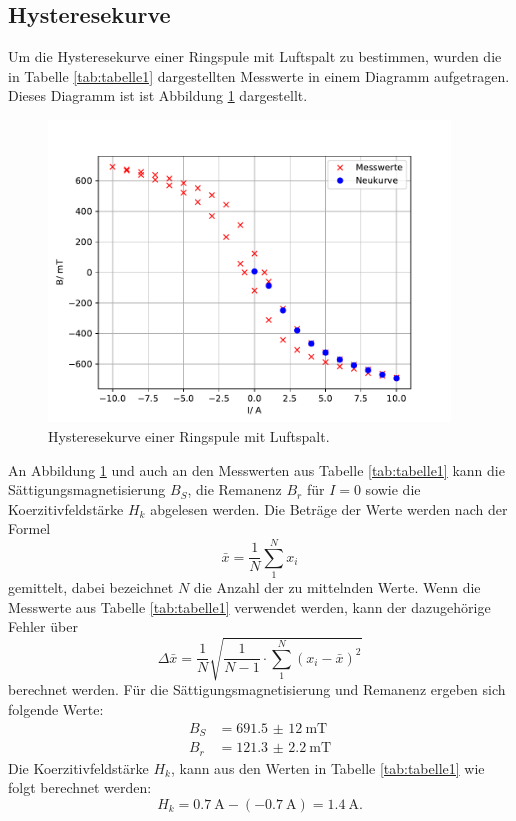 \subsection{Hysteresekurve}
\noindent Um die Hysteresekurve einer Ringspule mit
Luftspalt zu bestimmen, wurden die in Tabelle
\ref{tab:tabelle1} dargestellten Messwerte in einem
Diagramm aufgetragen. Dieses Diagramm ist ist Abbildung
\ref{fig:plothys} dargestellt.

\begin{figure}[H]
  \centering
  \includegraphics[height=8cm]{plothys.pdf}
  \caption{Hysteresekurve einer Ringspule mit Luftspalt.}
  \label{fig:plothys}
\end{figure}
\noindent An Abbildung \ref{fig:plothys} und auch an den
Messwerten
aus Tabelle \ref{tab:tabelle1} kann die
Sättigungsmagnetisierung $B_{S}$, die Remanenz
$B_{r}$ für $I=0$ sowie die Koerzitivfeldstärke
$H_{k}$ abgelesen werden.
Die Beträge der Werte werden nach der Formel
\begin{equation}
  \bar{x}=\frac{1}{N}\sum_{1}^N x_{i}
  \label{eqn:mittel}
\end{equation}
gemittelt, dabei bezeichnet $N$ die Anzahl der zu
mittelnden Werte. Wenn die Messwerte aus Tabelle \ref{tab:tabelle1} verwendet
werden, kann der dazugehörige Fehler über
\begin{equation}
  \Delta\bar x = \frac{1}{N}\sqrt{\frac{1}{N-1}\cdot\sum_{1}^N (x_{i}-\bar x)^2}
\end{equation}
berechnet werden.
Für die Sättigungsmagnetisierung und
Remanenz ergeben sich folgende Werte:
\begin{align*}
  B_{S} &=\SI{691,5(12)}{\milli\tesla} \\
  B_{r} &=\SI{121.3(22)}{\milli\tesla}
\end{align*}
Die Koerzitivfeldstärke $H_{k}$, kann aus den Werten in
Tabelle \ref{tab:tabelle1} wie folgt berechnet werden:
\begin{equation}
  H_{k}=\SI{0,7}{\ampere}-(\SI{-0,7}{\ampere})=\SI{1,4}{\ampere}.
  \label{eqn:koerzitiv}
\end{equation}


